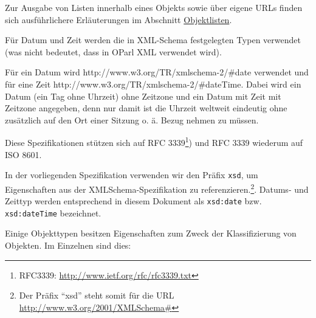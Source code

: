 \documentclass[,a4paper]{article}
\begin{document}
Zur Ausgabe von Listen innerhalb eines Objekts sowie über eigene URLs
finden sich ausführlichere Erläuterungen im Abschnitt
\hyperref[objektlisten]{Objektlisten}.


Für Datum und Zeit werden die in XML-Schema festgelegten Typen verwendet
(was nicht bedeutet, dass in OParl XML verwendet wird).

Für ein Datum wird http://www.w3.org/TR/xmlschema-2/\#date verwendet und
für eine Zeit http://www.w3.org/TR/xmlschema-2/\#dateTime. Dabei wird
ein Datum (ein Tag ohne Uhrzeit) ohne Zeitzone und ein Datum mit Zeit
mit Zeitzone angegeben, denn nur damit ist die Uhrzeit weltweit
eindeutig ohne zusätzlich auf den Ort einer Sitzung o. ä. Bezug nehmen
zu müssen.

Diese Spezifikationen stützen sich auf RFC 3339\footnote{RFC3339:
  \url{http://www.ietf.org/rfc/rfc3339.txt}}) und RFC 3339 wiederum auf
ISO 8601.

In der vorliegenden Spezifikation verwenden wir den Präfix \texttt{xsd},
um Eigenschaften aus der XMLSchema-Spezifikation zu
referenzieren.\footnote{Der Präfix ``xsd'' steht somit für die URL
  \url{http://www.w3.org/2001/XMLSchema\#}}. Datums- und Zeittyp werden
entsprechend in diesem Dokument als \texttt{xsd:date} bzw.
\texttt{xsd:dateTime} bezeichnet.


Einige Objekttypen besitzen Eigenschaften zum Zweck der Klassifizierung
von Objekten. Im Einzelnen sind dies:
\end{document}
